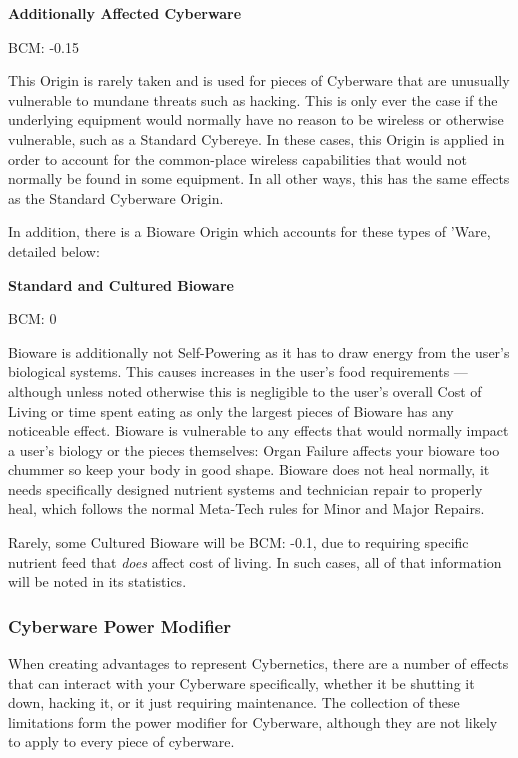 \begin{multicols*}{3}
	\noindent
	\textbf{Additionally Affected Cyberware}
	
	BCM: -0.15
	
	This Origin is rarely taken and is used for pieces of Cyberware that are unusually vulnerable to mundane threats such as hacking. This is only ever the case if the underlying equipment would normally have no reason to be wireless or otherwise vulnerable, such as a Standard Cybereye. In these cases, this Origin is applied in order to account for the common-place wireless capabilities that would not normally be found in some equipment. In all other ways, this has the same effects as the Standard Cyberware Origin.
	
	\vspace*{\baselineskip}
	In addition, there is a Bioware Origin which accounts for these types of 'Ware, detailed below:
	
	\noindent
	\textbf{Standard and Cultured Bioware}
	
	BCM: 0
	
	Bioware is additionally not Self-Powering as it has to draw energy from the user's biological systems. This causes increases in the user's food requirements — although unless noted otherwise this is negligible to the user's overall Cost of Living or time spent eating as only the largest pieces of Bioware has any noticeable effect. Bioware is vulnerable to any effects that would normally impact a user's biology or the pieces themselves: Organ Failure affects your bioware too chummer so keep your body in good shape. Bioware does not heal normally, it needs specifically designed nutrient systems and technician repair to properly heal, which follows the normal \GURPS Meta-Tech rules for Minor and Major Repairs.
	
	Rarely, some Cultured Bioware will be BCM: -0.1, due to requiring specific nutrient feed that \textit{does} affect cost of living. In such cases, all of that information will be noted in its statistics.
	
	\subsubsection{Cyberware Power Modifier}
	
	When creating advantages to represent Cybernetics, there are a number of effects that can interact with your Cyberware specifically, whether it be shutting it down, hacking it, or it just requiring maintenance. The collection of these limitations form the power modifier for Cyberware, although they are not likely to apply to every piece of cyberware.
	

\end{multicols*}
